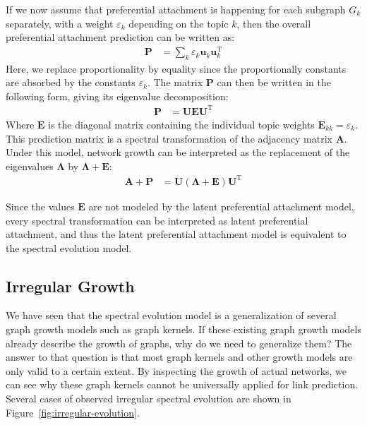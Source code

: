 \documentclass[11pt,a4paper]{book}
\begin{document}
If we now assume that preferential attachment is happening for each
subgraph $G_k$ separately, with a weight $\varepsilon_k$ depending on the
topic $k$, then the overall preferential attachment prediction can be
written as:
\begin{align*}
  \mathbf P &= \sum_k \varepsilon_k^{\phantom{\mathrm I}} \mathbf
  u_k^{\phantom{\mathrm I}} \mathbf u_k^{\mathrm T} 
\end{align*}
Here, we replace proportionality by equality since the proportionally
constants are absorbed by the constants $\varepsilon_k$.  The matrix $\mathbf
P$ can then be written in the following form, giving its eigenvalue
decomposition:
\begin{align*}
  \mathbf P &= \mathbf U \mathbf E \mathbf U^{\mathrm T} 
\end{align*}
Where $\mathbf E$ is the diagonal matrix containing the individual topic
weights $\mathbf E_{kk} = \varepsilon_k$.  
This prediction matrix is a spectral transformation of the adjacency
matrix $\mathbf A$.  Under this model, network growth can be interpreted
as the replacement of the eigenvalues $\mathbf \Lambda$ by $\mathbf
\Lambda + \mathbf E$:
\begin{align*}
  \mathbf A + \mathbf P &= \mathbf U (\mathbf \Lambda + \mathbf E) \mathbf
  U^{\mathrm T}
\end{align*}

Since the values $\mathbf E$ are not modeled by the latent preferential
attachment model, every spectral transformation can be interpreted as
latent preferential attachment, and thus the latent preferential
attachment model is equivalent to the spectral evolution model. 

\subsection{Irregular Growth}
We have seen that the spectral evolution model is a generalization of
several graph growth models such as graph kernels.  If these existing
graph growth models already describe the growth of graphs, why do we
need to generalize them?  The answer to that question is that most
graph kernels and other growth models are only valid to a certain
extent.  
By inspecting the growth of actual networks, we can see why these graph
kernels cannot be universally applied for link prediction.
Several cases of observed
irregular spectral evolution are shown in 
Figure~\ref{fig:irregular-evolution}. 
\end{document}
